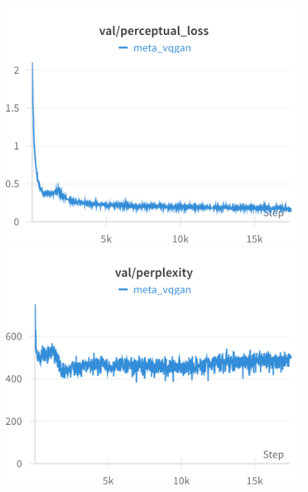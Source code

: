 \begin{figure}[H]
\includegraphics[width=\linewidth]{detailed_engineering/Meta VQGAN/charts/val_perceptual_loss.png}
\caption{}
\endminipage\hfill
{}
\includegraphics[width=\linewidth]{detailed_engineering/Meta VQGAN/charts/val_perplexity.png}
\caption{}
\endminipage
\end{figure}

